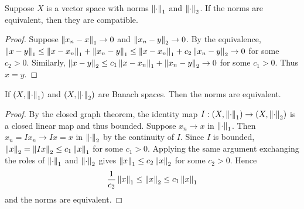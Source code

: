 \begin{proposition}\label{prop:equiv_compatible}
    Suppose $X$ is a vector space with norms $\left\lVert {\cdot} \right\rVert_1$ and $\left\lVert {\cdot} \right\rVert_2$. 
    If the norms are equivalent, then they are compatible.
\end{proposition}
\begin{proof}
    Suppose $\left\lVert {x_n-x} \right\rVert_1\to 0$ and $\left\lVert {x_n-y} \right\rVert_2\to 0$. By the equivalence, 
    $\left\lVert {x-y} \right\rVert_1\leq \left\lVert {x-x_n} \right\rVert_1 + \left\lVert {x_n-y} \right\rVert_1\leq \left\lVert {x-x_n} \right\rVert_1 + c_2\left\lVert {x_n-y} \right\rVert_2\to 0$ 
    for some $c_2>0$. Similarly, $\left\lVert {x-y} \right\rVert_2\leq c_1\left\lVert {x-x_n} \right\rVert_1 + \left\lVert {x_n-y} \right\rVert_2\to 0$ 
    for some $c_1>0$. Thus $x=y$.
\end{proof}

\begin{proposition}\label{prop:equivalent_norm}
    If $(X,\left\lVert {\cdot} \right\rVert_1)$ and $(X,\left\lVert {\cdot} \right\rVert_2)$ are Banach spaces. Then 
    the norms are equivalent.
\end{proposition}
\begin{proof}
    By the closed graph theorem, the identity map $I:(X,\left\lVert {\cdot} \right\rVert_1)\to(X,\left\lVert {\cdot} \right\rVert_2)$ 
    is a closed linear map and thus bounded. Suppose $x_n\to x$ in $\left\lVert {\cdot} \right\rVert_1$. 
    Then $x_n = Ix_n\to Ix = x$ in $\left\lVert {\cdot} \right\rVert_2$ by the continuity of $I$. Since 
    $I$ is bounded, $\left\lVert {x} \right\rVert_2 = \left\lVert {Ix} \right\rVert_2 \leq c_1\left\lVert {x} \right\rVert_1$ for some $c_1>0$. 
    Applying the same argument exchanging the roles of $\left\lVert {\cdot} \right\rVert_1$ and $\left\lVert {\cdot} \right\rVert_2$ 
    gives $\left\lVert {x} \right\rVert_1 \leq c_2\left\lVert {x} \right\rVert_2$ for some $c_2>0$. Hence 
    \begin{equation*}
        \frac{1}{c_2}\left\lVert {x} \right\rVert_1 \leq \left\lVert {x} \right\rVert_2 \leq c_1\left\lVert {x} \right\rVert_1
    \end{equation*}
    and the norms are equivalent.
\end{proof}
